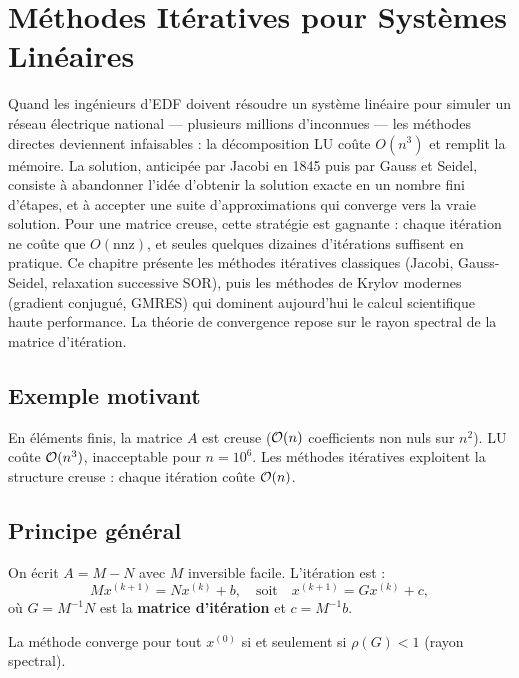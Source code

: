 \chapter{M\'ethodes It\'eratives pour Syst\`emes Lin\'eaires}
\label{ch:iteratives}

Quand les ingénieurs d'EDF doivent résoudre un système linéaire pour simuler un réseau électrique national --- plusieurs millions d'inconnues --- les méthodes directes deviennent infaisables : la décomposition LU coûte $O(n^3)$ et remplit la mémoire. La solution, anticipée par Jacobi en 1845 puis par Gauss et Seidel, consiste à abandonner l'idée d'obtenir la solution exacte en un nombre fini d'étapes, et à accepter une suite d'approximations qui converge vers la vraie solution. Pour une matrice creuse, cette stratégie est gagnante : chaque itération ne coûte que $O(\text{nnz})$, et seules quelques dizaines d'itérations suffisent en pratique. Ce chapitre présente les méthodes itératives classiques (Jacobi, Gauss-Seidel, relaxation successive SOR), puis les méthodes de Krylov modernes (gradient conjugué, GMRES) qui dominent aujourd'hui le calcul scientifique haute performance. La théorie de convergence repose sur le rayon spectral de la matrice d'itération.

\section{Exemple motivant}
En \'el\'ements finis, la matrice $A$ est creuse ($\mathcal{O}(n)$ coefficients non nuls sur $n^2$). LU co\^ute $\mathcal{O}(n^3)$, inacceptable pour $n=10^6$. Les m\'ethodes it\'eratives exploitent la structure creuse : chaque it\'eration co\^ute $\mathcal{O}(n)$.

\section{Principe g\'en\'eral}

\begin{definition}
On \'ecrit $A=M-N$ avec $M$ inversible facile. L'it\'eration est :
\[
Mx^{(k+1)} = Nx^{(k)}+b, \quad\text{soit}\quad x^{(k+1)}=Gx^{(k)}+c,
\]
o\`u $G=M^{-1}N$ est la \textbf{matrice d'it\'eration} et $c=M^{-1}b$.
\end{definition}

\begin{theoreme}[Convergence]\label{thm:iter-conv}
La m\'ethode converge pour tout $x^{(0)}$ si et seulement si $\rho(G)<1$ (rayon spectral).
\end{theoreme}

